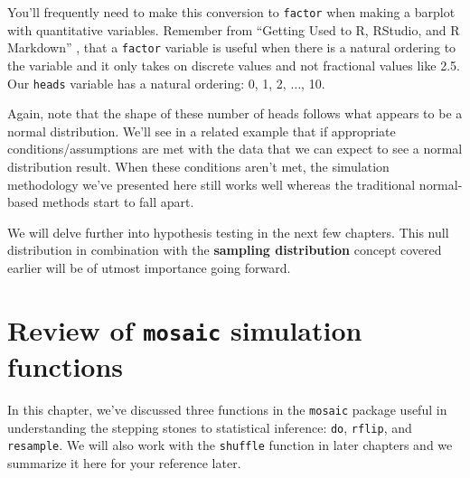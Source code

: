 \documentclass[]{tufte-book}
\begin{document}
You'll frequently need to make this conversion to \texttt{factor} when
making a barplot with quantitative variables. Remember from ``Getting
Used to R, RStudio, and R Markdown'' \citep{usedtor2016}, that a
\texttt{factor} variable is useful when there is a natural ordering to
the variable and it only takes on discrete values and not fractional
values like 2.5. Our \texttt{heads} variable has a natural ordering: 0,
1, 2, \(\ldots\), 10.

Again, note that the shape of these number of heads follows what appears
to be a normal distribution. We'll see in a related example that if
appropriate conditions/assumptions are met with the data that we can
expect to see a normal distribution result. When these conditions aren't
met, the simulation methodology we've presented here still works well
whereas the traditional normal-based methods start to fall apart.

We will delve further into hypothesis testing in the next few chapters.
This null distribution in combination with the \textbf{sampling
distribution} concept covered earlier will be of utmost importance going
forward.

\section{\texorpdfstring{Review of \texttt{mosaic} simulation
functions}{Review of mosaic simulation functions}}\label{review-of-mosaic-simulation-functions}

In this chapter, we've discussed three functions in the \texttt{mosaic}
package useful in understanding the stepping stones to statistical
inference: \texttt{do}, \texttt{rflip}, and \texttt{resample}. We will
also work with the \texttt{shuffle} function in later chapters and we
summarize it here for your reference later.
\end{document}
